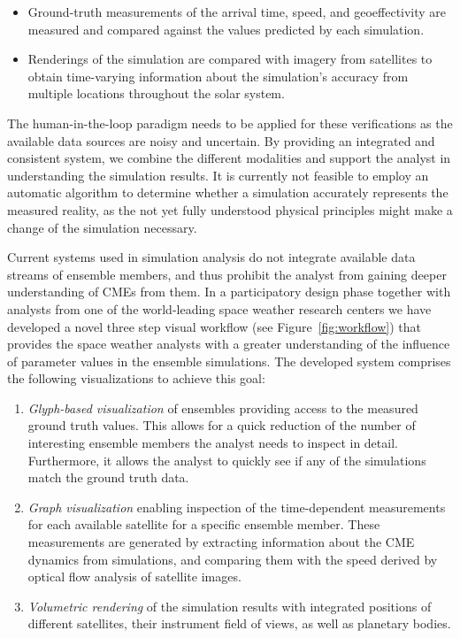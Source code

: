 \documentclass[journal]{vgtc}                %
\begin{document}
\begin{itemize}

\item{Ground-truth measurements of the arrival time, speed, and geoeffectivity are measured and compared against the values predicted by each simulation.} 

\item{Renderings of the simulation are compared with imagery from satellites to obtain time-varying information about the simulation's accuracy from multiple locations throughout the solar system.} 

\end{itemize}

The human-in-the-loop paradigm needs to be applied for these verifications as the available data sources are noisy and uncertain. By providing an integrated and consistent system, we combine the different modalities and support the analyst in understanding the simulation results. It is currently not feasible to employ an automatic algorithm to determine whether a simulation accurately represents the measured reality, as the not yet fully understood physical principles might make a change of the simulation necessary. 

Current systems used in simulation analysis do not integrate available data streams of ensemble members, and thus prohibit the analyst from gaining deeper understanding of CMEs from them. In a participatory design phase together with analysts from one of the world-leading space weather research centers we have developed a novel three step visual workflow (see Figure~\ref{fig:workflow}) that provides the space weather analysts with a greater understanding of the influence of parameter values in the ensemble simulations. The developed system comprises the following visualizations to achieve this goal:

\begin{enumerate}

\item{\emph{Glyph-based visualization} of ensembles providing access to the measured ground truth values. This allows for a quick reduction of the number of interesting ensemble members the analyst needs to inspect in detail. Furthermore, it allows the analyst to quickly see if any of the simulations match the ground truth data.}

\item{\emph{Graph visualization} enabling inspection of the time-dependent measurements for each available satellite for a specific ensemble member. These measurements are generated by extracting information about the CME dynamics from simulations, and comparing them with the speed derived by optical flow analysis of satellite images.}

\item{\emph{Volumetric rendering} of the simulation results with integrated positions of different satellites, their instrument field of views, as well as planetary bodies.}

\end{enumerate} 
\end{document}
